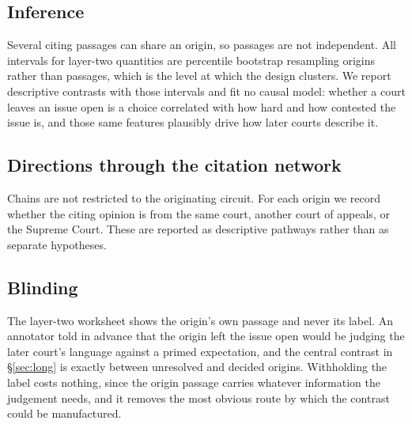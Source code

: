 \subsection{Inference} Several citing passages can share an origin, so passages
are not independent. All intervals for layer-two quantities are percentile
bootstrap resampling origins rather than passages, which is the level at which
the design clusters. We report descriptive contrasts with those intervals and
fit no causal model: whether a court leaves an issue open is a choice correlated
with how hard and how contested the issue is, and those same features plausibly
drive how later courts describe it.

\subsection{Directions through the citation network} Chains are not restricted to
the originating circuit. For each origin we record whether the citing opinion is
from the same court, another court of appeals, or the Supreme Court. These are
reported as descriptive pathways rather than as separate hypotheses.

\subsection{Blinding} The layer-two worksheet shows the origin's own passage and
never its label. An annotator told in advance that the origin left the issue open
would be judging the later court's language against a primed expectation, and the
central contrast in \S\ref{sec:long} is exactly between unresolved and decided
origins. Withholding the label costs nothing, since the origin passage carries
whatever information the judgement needs, and it removes the most obvious route
by which the contrast could be manufactured.
